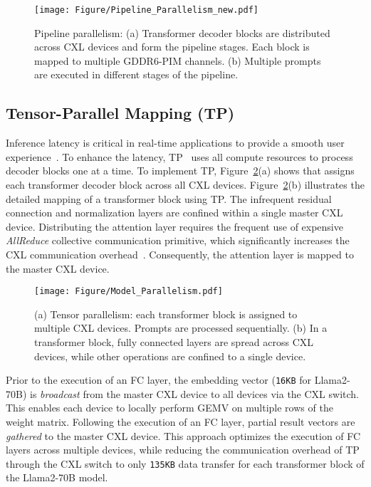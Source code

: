 \begin{figure}[h]
    \centering
    \texttt{[image: Figure/Pipeline\_Parallelism\_new.pdf]}
    \caption{Pipeline parallelism: (a) Transformer decoder blocks are distributed across CXL devices and form the pipeline stages. Each block is mapped to multiple GDDR6-PIM channels. (b) Multiple prompts are executed in different stages of the pipeline.}
    \label{fig:Pipeline_Parallelism}
\end{figure}

\subsection{Tensor-Parallel Mapping (TP)}

Inference latency is critical in real-time applications to provide a smooth user experience~\cite{fowers2018configurable}.
To enhance the latency, TP~\cite{alpa, megatron} uses all compute resources to process decoder blocks one at a time.
To implement TP, Figure~\ref{fig:Model_Parallelism}(a) shows that \att{} assigns each transformer decoder block across all CXL devices.
Figure~\ref{fig:Model_Parallelism}(b) illustrates the detailed mapping of a transformer block using TP.
The infrequent residual connection and normalization layers are confined within a single master CXL device.
Distributing the attention layer requires the frequent use of expensive \textit{AllReduce} collective communication primitive, which significantly increases the CXL communication overhead~\cite{megatron}.
Consequently, the attention layer is mapped to the master CXL device.

\begin{figure}[h]
    \centering
    \texttt{[image: Figure/Model\_Parallelism.pdf]}
    \caption{(a) Tensor parallelism: each transformer block is assigned to multiple CXL devices. Prompts are processed sequentially. (b) In a transformer block, fully connected layers are spread across CXL devices, while other operations are confined to a single device.}
	\label{fig:Model_Parallelism}
\end{figure}

Prior to the execution of an FC layer, the embedding vector (\texttt{16KB} for Llama2-70B) is \textit{broadcast} from the master CXL device to all devices via the CXL switch.
This enables each device to locally perform GEMV on multiple rows of the weight matrix.
Following the execution of an FC layer, partial result vectors are \textit{gathered} to the master CXL device.
This approach optimizes the execution of FC layers across multiple devices, while reducing the communication overhead of TP through the CXL switch to only \texttt{135KB} data transfer for each transformer block of the Llama2-70B model.


